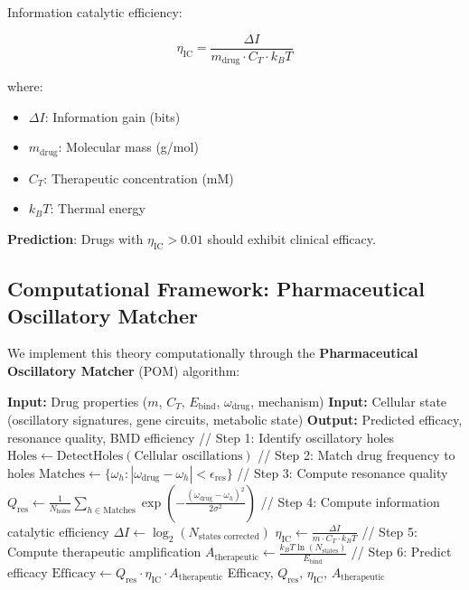 \documentclass{article}
\begin{document}
Information catalytic efficiency:

\begin{equation}
\boxed{\eta_{\text{IC}} = \frac{\Delta I}{m_{\text{drug}} \cdot C_T \cdot k_B T}}
\end{equation}

where:
\begin{itemize}
    \item $\Delta I$: Information gain (bits)
    \item $m_{\text{drug}}$: Molecular mass (g/mol)
    \item $C_T$: Therapeutic concentration (mM)
    \item $k_B T$: Thermal energy
\end{itemize}

\textbf{Prediction}: Drugs with $\eta_{\text{IC}} > 0.01$ should exhibit clinical efficacy.

\subsection{Computational Framework: Pharmaceutical Oscillatory Matcher}

We implement this theory computationally through the \textbf{Pharmaceutical Oscillatory Matcher} (POM) algorithm:

\begin{algorithm}
\caption{Pharmaceutical Oscillatory Matcher}
\begin{algorithmic}[1]
\STATE \textbf{Input:} Drug properties ($m$, $C_T$, $E_{\text{bind}}$, $\omega_{\text{drug}}$, mechanism)
\STATE \textbf{Input:} Cellular state (oscillatory signatures, gene circuits, metabolic state)
\STATE \textbf{Output:} Predicted efficacy, resonance quality, BMD efficiency
\STATE
\STATE // Step 1: Identify oscillatory holes
\STATE $\text{Holes} \leftarrow \text{DetectHoles}(\text{Cellular oscillations})$
\STATE
\STATE // Step 2: Match drug frequency to holes
\STATE $\text{Matches} \leftarrow \{\omega_h : |\omega_{\text{drug}} - \omega_h| < \epsilon_{\text{res}}\}$
\STATE
\STATE // Step 3: Compute resonance quality
\STATE $Q_{\text{res}} \leftarrow \frac{1}{N_{\text{holes}}} \sum_{h \in \text{Matches}} \exp\left(-\frac{(\omega_{\text{drug}} - \omega_h)^2}{2\sigma^2}\right)$
\STATE
\STATE // Step 4: Compute information catalytic efficiency
\STATE $\Delta I \leftarrow \log_2(N_{\text{states corrected}})$
\STATE $\eta_{\text{IC}} \leftarrow \frac{\Delta I}{m \cdot C_T \cdot k_B T}$
\STATE
\STATE // Step 5: Compute therapeutic amplification
\STATE $A_{\text{therapeutic}} \leftarrow \frac{k_B T \ln(N_{\text{states}})}{E_{\text{bind}}}$
\STATE
\STATE // Step 6: Predict efficacy
\STATE $\text{Efficacy} \leftarrow Q_{\text{res}} \cdot \eta_{\text{IC}} \cdot A_{\text{therapeutic}}$
\STATE
\RETURN Efficacy, $Q_{\text{res}}$, $\eta_{\text{IC}}$, $A_{\text{therapeutic}}$
\end{algorithmic}
\end{algorithm}
\end{document}
